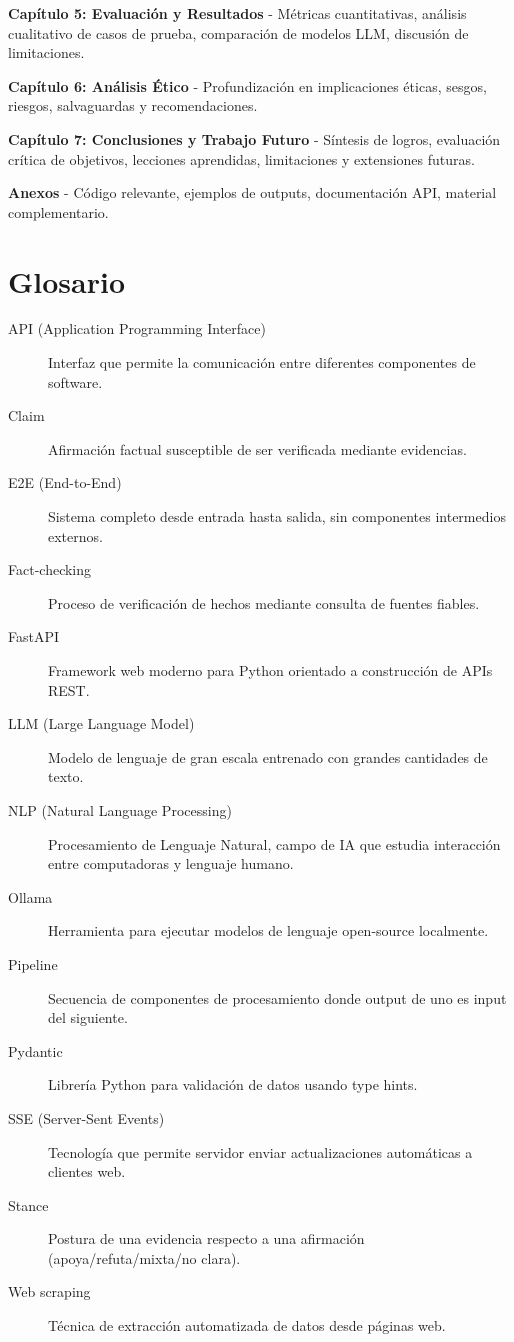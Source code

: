 \documentclass[12pt,a4paper,twoside]{book}
\begin{document}
\textbf{Capítulo 5: Evaluación y Resultados} - Métricas cuantitativas, análisis cualitativo de casos de prueba, comparación de modelos LLM, discusión de limitaciones.

\textbf{Capítulo 6: Análisis Ético} - Profundización en implicaciones éticas, sesgos, riesgos, salvaguardas y recomendaciones.

\textbf{Capítulo 7: Conclusiones y Trabajo Futuro} - Síntesis de logros, evaluación crítica de objetivos, lecciones aprendidas, limitaciones y extensiones futuras.

\textbf{Anexos} - Código relevante, ejemplos de outputs, documentación API, material complementario.

\section{Glosario}

\begin{description}
    \item[API (Application Programming Interface)] Interfaz que permite la comunicación entre diferentes componentes de software.
    \item[Claim] Afirmación factual susceptible de ser verificada mediante evidencias.
    \item[E2E (End-to-End)] Sistema completo desde entrada hasta salida, sin componentes intermedios externos.
    \item[Fact-checking] Proceso de verificación de hechos mediante consulta de fuentes fiables.
    \item[FastAPI] Framework web moderno para Python orientado a construcción de APIs REST.
    \item[LLM (Large Language Model)] Modelo de lenguaje de gran escala entrenado con grandes cantidades de texto.
    \item[NLP (Natural Language Processing)] Procesamiento de Lenguaje Natural, campo de IA que estudia interacción entre computadoras y lenguaje humano.
    \item[Ollama] Herramienta para ejecutar modelos de lenguaje open-source localmente.
    \item[Pipeline] Secuencia de componentes de procesamiento donde output de uno es input del siguiente.
    \item[Pydantic] Librería Python para validación de datos usando type hints.
    \item[SSE (Server-Sent Events)] Tecnología que permite servidor enviar actualizaciones automáticas a clientes web.
    \item[Stance] Postura de una evidencia respecto a una afirmación (apoya/refuta/mixta/no clara).
    \item[Web scraping] Técnica de extracción automatizada de datos desde páginas web.
\end{description}



\end{document}
